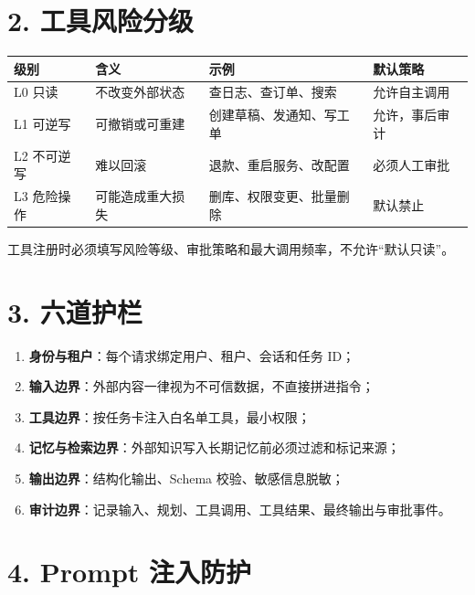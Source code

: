 \documentclass[9pt,a4paper,twocolumn]{ctexart}
\begin{document}
\section*{2. 工具风险分级}

{\footnotesize
\begin{tabular}{|p{}|p{}|p{}|p{}|}
\hline
\textbf{级别} & \textbf{含义} & \textbf{示例} & \textbf{默认策略} \\
\hline
L0 只读 & 不改变外部状态 & 查日志、查订单、搜索 & 允许自主调用 \\
\hline
L1 可逆写 & 可撤销或可重建 & 创建草稿、发通知、写工单 & 允许，事后审计 \\
\hline
L2 不可逆写 & 难以回滚 & 退款、重启服务、改配置 & 必须人工审批 \\
\hline
L3 危险操作 & 可能造成重大损失 & 删库、权限变更、批量删除 & 默认禁止 \\
\hline
\end{tabular}
}



工具注册时必须填写风险等级、审批策略和最大调用频率，不允许“默认只读”。



\section*{3. 六道护栏}

\begin{enumerate}[itemsep=1pt, topsep=2pt]
  \item \textbf{身份与租户}：每个请求绑定用户、租户、会话和任务 ID；
  \item \textbf{输入边界}：外部内容一律视为不可信数据，不直接拼进指令；
  \item \textbf{工具边界}：按任务卡注入白名单工具，最小权限；
  \item \textbf{记忆与检索边界}：外部知识写入长期记忆前必须过滤和标记来源；
  \item \textbf{输出边界}：结构化输出、Schema 校验、敏感信息脱敏；
  \item \textbf{审计边界}：记录输入、规划、工具调用、工具结果、最终输出与审批事件。
\end{enumerate}


\section*{4. Prompt 注入防护}
\end{document}
